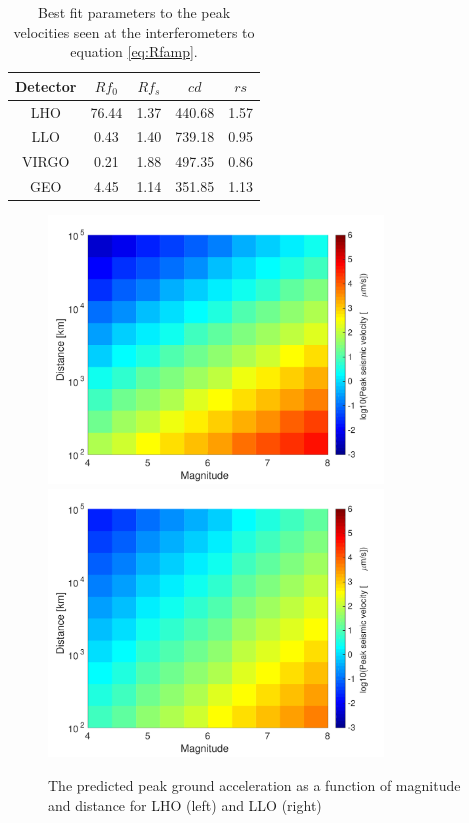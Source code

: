 \documentclass[reprint, prl, aps, showpacs]{revtex4-1}
\begin{document}
\begin{table}[]
\centering
\label{table:fit}
\begin{tabular}{|c|c|c|c|c|}
\hline
Detector & $Rf_0$ & $Rf_s$ & $cd$ & $rs$ \\ \hline
LHO & 76.44 & 1.37 & 440.68 & 1.57 \\ \hline
LLO & 0.43 & 1.40 & 739.18 & 0.95 \\ \hline
VIRGO & 0.21 & 1.88 & 497.35 & 0.86 \\ \hline
GEO & 4.45 & 1.14 & 351.85 & 1.13 \\ \hline
\end{tabular}
\caption{Best fit parameters to the peak velocities seen at the interferometers to equation \ref{eq:Rfamp}.}
\end{table}

\begin{figure}[t]
\hspace*{-0.5cm}
 \includegraphics[width=3.5in]{LHO_M_r.pdf}
 \includegraphics[width=3.5in]{LLO_M_r.pdf}
 \caption{The predicted peak ground acceleration as a function of magnitude and distance for LHO (left) and LLO (right)}
 \label{fig:MvsR}
\end{figure}
\end{document}
